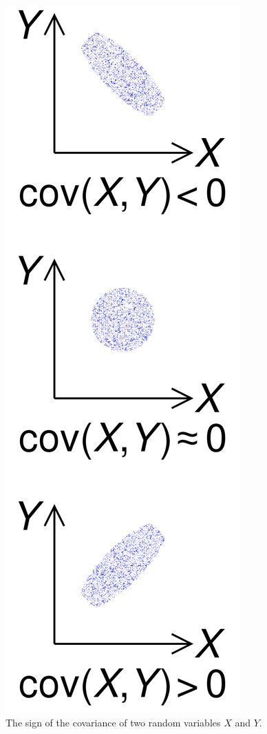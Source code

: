 \begin{figure}[h!]
\begin{center}
	\includegraphics[scale=0.1]{covariance_trends.png}
	\caption[]{The sign of the covariance of two random variables $X$ and $Y$.}
	\label{precisionrecall}
	\end{center}
	\end{figure}
	
